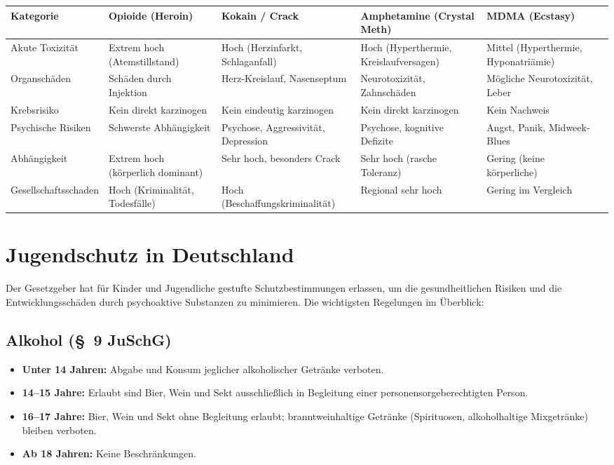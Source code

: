 \documentclass[11pt,a4paper]{article}
\begin{document}
	\begin{table}[h!]
		\centering
		\small
		\renewcommand{\arraystretch}{1.2}
		\begin{tabularx}{\textwidth}{@{} l X X X X X @{}}
			\toprule
			\textbf{Kategorie} & \textbf{Opioide (Heroin)} & \textbf{Kokain / Crack} & \textbf{Amphetamine (Crystal Meth)} & \textbf{MDMA (Ecstasy)} \\ \midrule
			Akute Toxizität & Extrem hoch (Atemstillstand) & Hoch (Herzinfarkt, Schlaganfall) & Hoch (Hyperthermie, Kreislaufversagen) & Mittel (Hyperthermie, Hyponatriämie) \\
			Organschäden & Schäden durch Injektion & Herz-Kreislauf, Nasenseptum & Neurotoxizität, Zahnschäden & Mögliche Neurotoxizität, Leber \\
			Krebsrisiko & Kein direkt karzinogen & Kein eindeutig karzinogen & Kein direkt karzinogen & Kein Nachweis \\
			Psychische Risiken & Schwerste Abhängigkeit & Psychose, Aggressivität, Depression & Psychose, kognitive Defizite & Angst, Panik, Midweek-Blues \\
			Abhängigkeit & Extrem hoch (körperlich dominant) & Sehr hoch, besonders Crack & Sehr hoch (rasche Toleranz) & Gering (keine körperliche) \\
			Gesellschaftsschaden & Hoch (Kriminalität, Todesfälle) & Hoch (Beschaffungskriminalität) & Regional sehr hoch & Gering im Vergleich \\
			\bottomrule
		\end{tabularx}
	\end{table}
	
	\section{Jugendschutz in Deutschland}
	
	Der Gesetzgeber hat für Kinder und Jugendliche gestufte Schutzbestimmungen erlassen, um die gesundheitlichen Risiken und die Entwicklungsschäden durch psychoaktive Substanzen zu minimieren. Die wichtigsten Regelungen im Überblick:
	
	\subsection{Alkohol (\S~9 JuSchG)}
	\begin{itemize}[leftmargin=*, noitemsep]
		\item \textbf{Unter 14 Jahren:} Abgabe und Konsum jeglicher alkoholischer Getränke verboten.
		\item \textbf{14–15 Jahre:} Erlaubt sind Bier, Wein und Sekt ausschließlich in Begleitung einer personensorgeberechtigten Person.
		\item \textbf{16–17 Jahre:} Bier, Wein und Sekt ohne Begleitung erlaubt; branntweinhaltige Getränke (Spirituosen, alkoholhaltige Mixgetränke) bleiben verboten.
		\item \textbf{Ab 18 Jahren:} Keine Beschränkungen.
	\end{itemize}
	
\end{document}

